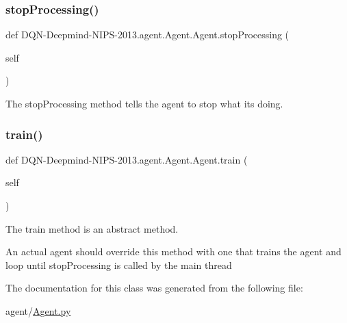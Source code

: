 \subsubsection{\texorpdfstring{stop\+Processing()}{stopProcessing()}}
{\footnotesize\ttfamily def D\+QN-\/Deepmind-\/N\+I\+PS-\/2013.agent.\+Agent.\+Agent.\+stop\+Processing (\begin{DoxyParamCaption}\item[{}]{self }\end{DoxyParamCaption})}



The stop\+Processing method tells the agent to stop what it\textquotesingle{}s doing. 

\hypertarget{classDQN-Deepmind-NIPS-2013_1_1agent_1_1Agent_1_1Agent_ae3b350736392d8ce39e7973d630f437a}{}\label{classDQN-Deepmind-NIPS-2013_1_1agent_1_1Agent_1_1Agent_ae3b350736392d8ce39e7973d630f437a} 
\subsubsection{\texorpdfstring{train()}{train()}}
{\footnotesize\ttfamily def D\+QN-\/Deepmind-\/N\+I\+PS-\/2013.agent.\+Agent.\+Agent.\+train (\begin{DoxyParamCaption}\item[{}]{self }\end{DoxyParamCaption})}



The train method is an abstract method. 

An actual agent should override this method with one that trains the agent and loop until stop\+Processing is called by the main thread 

The documentation for this class was generated from the following file\+:\begin{DoxyCompactItemize}
\item 
agent/\hyperlink{Agent_8py}{Agent.\+py}\end{DoxyCompactItemize}
